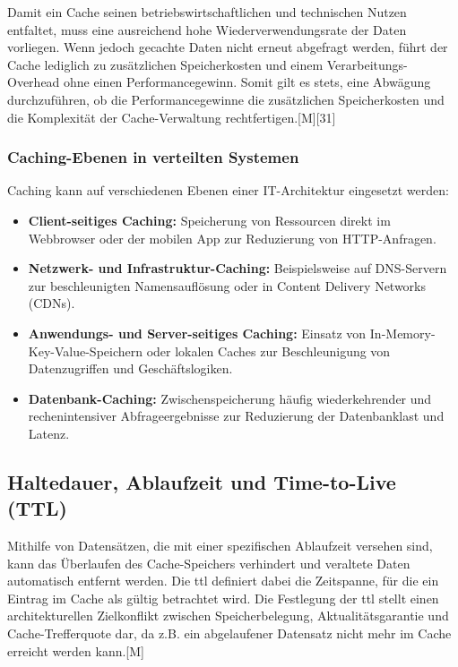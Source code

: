 Damit ein Cache seinen betriebswirtschaftlichen und technischen Nutzen entfaltet, muss eine ausreichend hohe Wiederverwendungsrate der Daten vorliegen. Wenn jedoch gecachte Daten nicht erneut abgefragt werden, führt der Cache lediglich zu zusätzlichen Speicherkosten und einem Verarbeitungs-Overhead ohne einen Performancegewinn. Somit gilt es stets, eine Abwägung durchzuführen, ob die Performancegewinne die zusätzlichen Speicherkosten und die Komplexität der Cache-Verwaltung rechtfertigen.[M][31]

\subsubsection{Caching-Ebenen in verteilten Systemen}

Caching kann auf verschiedenen Ebenen einer IT-Architektur eingesetzt werden:
\begin{itemize}
    \item \textbf{Client-seitiges Caching:} Speicherung von Ressourcen direkt im Webbrowser oder der mobilen App zur Reduzierung von HTTP-Anfragen.
    \item \textbf{Netzwerk- und Infrastruktur-Caching:} Beispielsweise auf DNS-Servern zur beschleunigten Namensauflösung oder in Content Delivery Networks (CDNs).
    \item \textbf{Anwendungs- und Server-seitiges Caching:} Einsatz von In-Memory-Key-Value-Speichern oder lokalen Caches zur Beschleunigung von Datenzugriffen und Geschäftslogiken.
    \item \textbf{Datenbank-Caching:} Zwischenspeicherung häufig wiederkehrender und rechenintensiver Abfrageergebnisse zur Reduzierung der Datenbanklast und Latenz.
\end{itemize}

\subsection{Haltedauer, Ablaufzeit und Time-to-Live (TTL)}
\label{subsec:ttl}

Mithilfe von Datensätzen, die mit einer spezifischen Ablaufzeit versehen sind, kann das Überlaufen des Cache-Speichers verhindert und veraltete Daten automatisch entfernt werden. Die \ac{ttl} definiert dabei die Zeitspanne, für die ein Eintrag im Cache als gültig betrachtet wird. Die Festlegung der \ac{ttl} stellt einen architekturellen Zielkonflikt zwischen Speicherbelegung, Aktualitätsgarantie und Cache-Trefferquote dar, da z.B. ein abgelaufener Datensatz nicht mehr im Cache erreicht werden kann.[M] %

